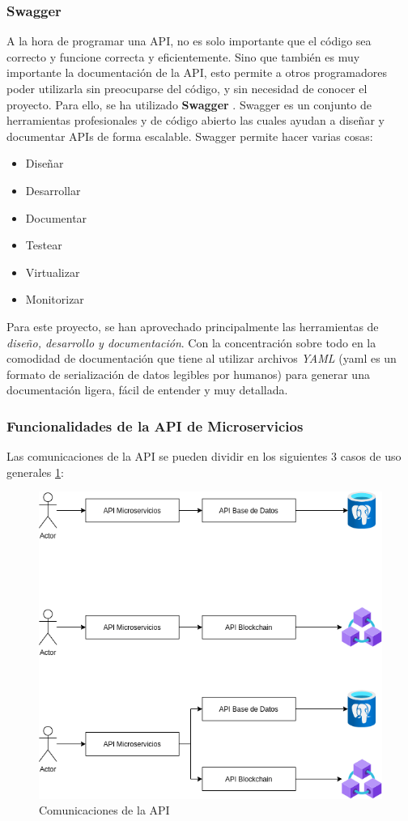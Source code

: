 \subsubsection{Swagger}
A la hora de programar una API, no es solo importante que el código sea correcto y funcione correcta y eficientemente. Sino que también es muy importante la documentación de la API, esto permite a otros programadores poder utilizarla sin preocuparse del código, y sin necesidad de conocer el proyecto. Para ello, se ha utilizado \textbf{Swagger} \cite{swagger}. Swagger es un conjunto de herramientas profesionales y de código abierto las cuales ayudan a diseñar y documentar APIs de forma escalable. Swagger permite hacer varias cosas:
\begin{itemize}
\item Diseñar
\item Desarrollar
\item Documentar
\item Testear
\item Virtualizar
\item Monitorizar
\end{itemize}

Para este proyecto, se han aprovechado principalmente las herramientas de \emph{diseño, desarrollo y documentación}. Con la concentración sobre todo en la comodidad de documentación que tiene al utilizar archivos \emph{YAML} (yaml es un formato de serialización de datos legibles por humanos) para generar una documentación ligera, fácil de entender y muy detallada. 

\subsubsection{Funcionalidades de la API de Microservicios}
Las comunicaciones de la API se pueden dividir en los siguientes 3 casos de uso generales \ref{fig:casosUso}:

\begin{figure}[h!]
  \centering
  \includegraphics[width=0.6\linewidth]{figs/Desarrollo/UML}
  \caption[Comunicaciones de la API]{Comunicaciones de la API}
  \label{fig:casosUso}
\end{figure}

